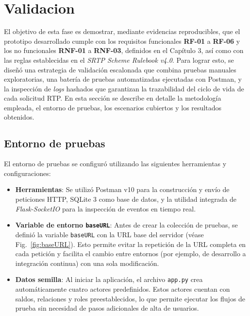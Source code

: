 \section{Validacion}
\label{sec:validacion}



El objetivo de esta fase es demostrar, mediante evidencias reproducibles, que el prototipo desarrollado cumple con los requisitos funcionales \textbf{RF-01} a \textbf{RF-06} y los no funcionales \textbf{RNF-01} a \textbf{RNF-03}, definidos en el Capítulo 3, así como con las reglas establecidas en el \textit{SRTP Scheme Rulebook v4.0}. Para lograr esto, se diseñó una estrategia de validación escalonada que combina pruebas manuales exploratorias, una batería de pruebas automatizadas ejecutadas con Postman, y la inspección de \textit{logs} hashados que garantizan la trazabilidad del ciclo de vida de cada solicitud RTP. En esta sección se describe en detalle la metodología empleada, el entorno de pruebas, los escenarios cubiertos y los resultados obtenidos.

\subsection{Entorno de pruebas}

El entorno de pruebas se configuró utilizando las siguientes herramientas y configuraciones:

\begin{itemize}
  \item \textbf{Herramientas}: Se utilizó Postman v10 para la construcción y envío de peticiones HTTP, SQLite 3 como base de datos, y la utilidad integrada de \textit{Flask-SocketIO} para la inspección de eventos en tiempo real.
  
  \item \textbf{Variable de entorno \texttt{baseURL}}: Antes de crear la colección de pruebas, se definió la variable \texttt{baseURL} con la URL base del servidor (véase Fig.~\ref{fig:baseURL}). Esto permite evitar la repetición de la URL completa en cada petición y facilita el cambio entre entornos (por ejemplo, de desarrollo a integración continua) con una sola modificación.
  
  \item \textbf{Datos semilla}: Al iniciar la aplicación, el archivo \texttt{app.py} crea automáticamente cuatro actores predefinidos. Estos actores cuentan con saldos, relaciones y roles preestablecidos, lo que permite ejecutar los flujos de prueba sin necesidad de pasos adicionales de alta de usuarios.
\end{itemize}

